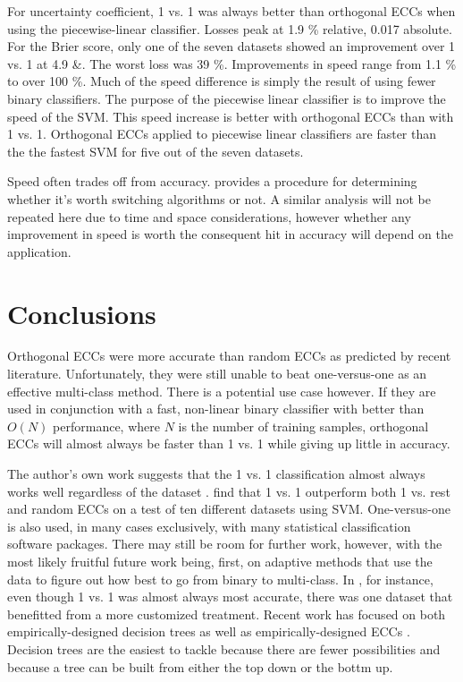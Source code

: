 For uncertainty coefficient, 1 vs. 1 was always better than orthogonal ECCs
when using the piecewise-linear classifier. 
Losses peak at 1.9 \% relative, 0.017 absolute.
For the Brier score, only one of the seven datasets showed an improvement
over 1 vs. 1 at 4.9 \&.
The worst loss was 39 \%.
Improvements in speed range from 1.1 \% to over 100 \%.
Much of the speed difference is simply the result of using fewer binary
classifiers.
The purpose of the piecewise linear classifier is to improve the speed of the
SVM.
This speed increase is better with orthogonal ECCs than with 1 vs. 1.
Orthogonal ECCs applied to piecewise linear classifiers 
are faster than the the fastest
SVM for five out of the seven datasets.

Speed often trades off from accuracy.
\citet{Mills2018} provides a procedure for determining whether it's worth
switching algorithms or not.
A similar analysis will not be repeated here due to time and space 
considerations, however whether any improvement in speed is worth
the consequent hit in accuracy will depend on the application.

\section{Conclusions}

Orthogonal ECCs were more accurate than random ECCs as predicted by
recent literature.
Unfortunately, they were still unable to beat one-versus-one as an
effective multi-class method.
There is a potential use case however. 
If they are used in conjunction with a fast, non-linear binary classifier
with better than $O(N)$ performance, where $N$ is the number of training
samples,
orthogonal ECCs will almost always be faster than 1 vs. 1
while giving up little in accuracy.

The author's own work suggests that the 1 vs. 1 classification almost always
works well regardless of the dataset \citep{Mills2018a}.
\citet{Hsu_Lin2002} find that 1 vs. 1 outperform both 1 vs. rest and random ECCs on a test
of ten different datasets using SVM.
One-versus-one is also used, in many cases exclusively, with many statistical classification software packages.
There may still be room for further work, however, with the most likely fruitful
future work being, first,
on adaptive methods that use the data to figure out how best to go
from binary to multi-class.
In \citet{Mills2018a}, for instance, even though 1 vs. 1 was almost always
most accurate, there was one dataset that benefitted from a more
customized treatment.
Recent work has focused on both empirically-designed decision trees 
\citep{Cheong_etal2004,Lee_Oh2003,Benabdeslem_Bennani2006}
as well as empirically-designed ECCs 
\citep{Crammer_Singer2002,Zhou_etal2008,Zhong_Cheriet2013}.
Decision trees are the easiest to tackle because there are fewer possibilities
and because a tree can be built from either the top down or the bottm up.

